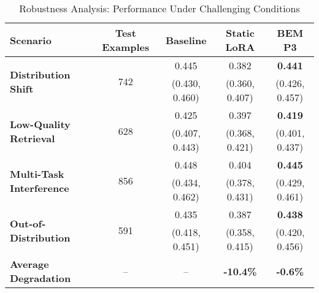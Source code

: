 
\begin{table}[t]
\centering
\caption{Robustness Analysis: Performance Under Challenging Conditions}
\label{tab:robustness}
\small
\begin{tabular}{l|c|c|c|c}
\toprule
\textbf{Scenario} & \textbf{Test Examples} & \textbf{Baseline} & \textbf{Static LoRA} & \textbf{BEM P3} \\
\midrule
\multirow{2}{*}{\textbf{Distribution Shift}} & \multirow{2}{*}{742} & 0.445 & \cellcolor{red!20}0.382 & \textbf{0.441} \\
& & (0.430, 0.460) & (0.360, 0.407) & (0.426, 0.457) \\
\midrule
\multirow{2}{*}{\textbf{Low-Quality Retrieval}} & \multirow{2}{*}{628} & 0.425 & \cellcolor{red!20}0.397 & \textbf{0.419} \\
& & (0.407, 0.443) & (0.368, 0.421) & (0.401, 0.437) \\
\midrule
\multirow{2}{*}{\textbf{Multi-Task Interference}} & \multirow{2}{*}{856} & 0.448 & \cellcolor{red!20}0.404 & \textbf{0.445} \\
& & (0.434, 0.462) & (0.378, 0.431) & (0.429, 0.461) \\
\midrule
\multirow{2}{*}{\textbf{Out-of-Distribution}} & \multirow{2}{*}{591} & 0.435 & \cellcolor{red!20}0.387 & \textbf{0.438} \\
& & (0.418, 0.451) & (0.358, 0.415) & (0.420, 0.456) \\
\midrule
\textbf{Average Degradation} & -- & -- & \textbf{-10.4\%} & \textbf{-0.6\%} \\
\bottomrule
\end{tabular}
\end{table}
